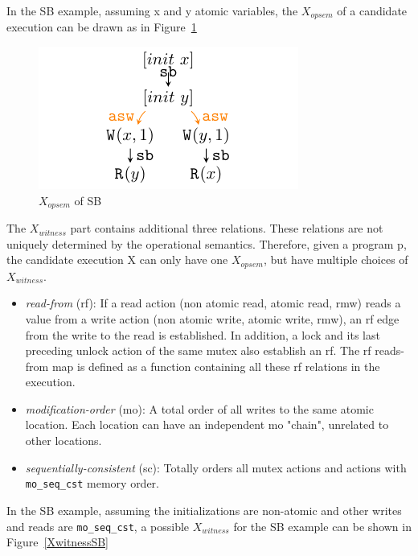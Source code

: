 In the SB example, assuming x and y atomic variables, the $X_{opsem}$ of a candidate execution can be drawn as in Figure~\ref{XopsemSB}

\begin{figure}[h!tbp] %
	\centering
	\includegraphics[scale=1]{figure/exec-graph/SB1.pdf} %
	\caption{$X_{opsem}$ of SB} %
	\label{XopsemSB} %
\end{figure}

The $X_{witness}$ part contains additional three relations. These relations are not uniquely determined by the operational semantics. Therefore, given a program p, the candidate execution X can only have one $X_{opsem}$, but have multiple choices of $X_{witness}$.

\begin{itemize}
	\item \textit{read-from} (rf): If a read action (non atomic read, atomic read, rmw) reads a value from a write action (non atomic write, atomic write, rmw), an rf edge from the write to the read is established. In addition, a lock and its last preceding unlock action of the same mutex also establish an rf. The rf reads-from map is defined as a function containing all these rf relations in the execution.
	\item \textit{modification-order} (mo): A total order of all writes to the same atomic location. Each location can have an independent mo "chain", unrelated to other locations.
	\item \textit{sequentially-consistent} (sc): Totally orders all mutex actions and actions with \texttt{mo\_seq\_cst} memory order.
\end{itemize}

In the SB example, assuming the initializations are non-atomic and other writes and reads are \texttt{mo\_seq\_cst}, a possible $X_{witness}$ for the SB example can be shown in Figure~\ref{XwitnessSB}

